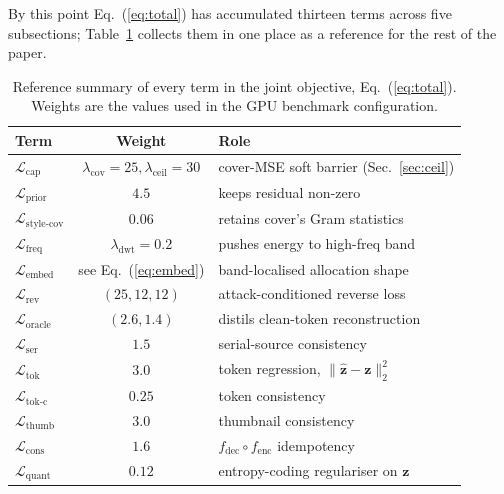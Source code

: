 \documentclass[runningheads]{llncs}
\begin{document}
By this point Eq.~(\ref{eq:total}) has accumulated thirteen terms across five subsections; Table~\ref{tab:losscheat} collects them in one place as a reference for the rest of the paper.

\begin{table}[t]
\centering
\caption{Reference summary of every term in the joint objective, Eq.~(\ref{eq:total}). Weights are the values used in the GPU benchmark configuration.}
\label{tab:losscheat}
\setlength{\tabcolsep}{6pt}
\small
\begin{tabular}{lcl}
\toprule
\textbf{Term} & \textbf{Weight} & \textbf{Role} \\
\midrule
$\mathcal{L}_{\text{cap}}$ & $\lambda_{\text{cov}}\!=\!25,\lambda_{\text{ceil}}\!=\!30$ & cover-MSE soft barrier (Sec.~\ref{sec:ceil}) \\
\rowcolor{rowshade}
$\mathcal{L}_{\text{prior}}$ & $4.5$ & keeps residual non-zero \\
$\mathcal{L}_{\text{style-cov}}$ & $0.06$ & retains cover's Gram statistics \\
\rowcolor{rowshade}
$\mathcal{L}_{\text{freq}}$ & $\lambda_{\text{dwt}}\!=\!0.2$ & pushes energy to high-freq band \\
$\mathcal{L}_{\text{embed}}$ & see Eq.~(\ref{eq:embed}) & band-localised allocation shape \\
\rowcolor{rowshade}
$\mathcal{L}_{\text{rev}}$ & $(25,12,12)$ & attack-conditioned reverse loss \\
$\mathcal{L}_{\text{oracle}}$ & $(2.6, 1.4)$ & distils clean-token reconstruction \\
\rowcolor{rowshade}
$\mathcal{L}_{\text{ser}}$ & $1.5$ & serial-source consistency \\
$\mathcal{L}_{\text{tok}}$ & $3.0$ & token regression, $\|\hat{\mathbf{z}}-\mathbf{z}\|_2^2$ \\
\rowcolor{rowshade}
$\mathcal{L}_{\text{tok-c}}$ & $0.25$ & token consistency \\
$\mathcal{L}_{\text{thumb}}$ & $3.0$ & thumbnail consistency \\
\rowcolor{rowshade}
$\mathcal{L}_{\text{cons}}$ & $1.6$ & $f_{\text{dec}}\!\circ\!f_{\text{enc}}$ idempotency \\
$\mathcal{L}_{\text{quant}}$ & $0.12$ & entropy-coding regulariser on $\mathbf{z}$ \\
\bottomrule
\end{tabular}
\end{table}
\end{document}
